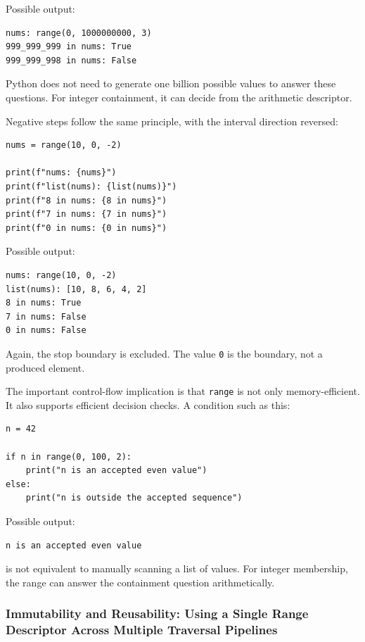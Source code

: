 Possible output:

\begin{verbatim}
nums: range(0, 1000000000, 3)
999_999_999 in nums: True
999_999_998 in nums: False
\end{verbatim}

Python does not need to generate one billion possible values to answer these questions. For integer containment, it can decide from the arithmetic descriptor.

Negative steps follow the same principle, with the interval direction reversed:

\begin{verbatim}
nums = range(10, 0, -2)

print(f"nums: {nums}")
print(f"list(nums): {list(nums)}")
print(f"8 in nums: {8 in nums}")
print(f"7 in nums: {7 in nums}")
print(f"0 in nums: {0 in nums}")
\end{verbatim}

Possible output:

\begin{verbatim}
nums: range(10, 0, -2)
list(nums): [10, 8, 6, 4, 2]
8 in nums: True
7 in nums: False
0 in nums: False
\end{verbatim}

Again, the stop boundary is excluded. The value \texttt{0} is the boundary, not a produced element.

The important control-flow implication is that \texttt{range} is not only memory-efficient. It also supports efficient decision checks. A condition such as this:

\begin{verbatim}
n = 42

if n in range(0, 100, 2):
    print("n is an accepted even value")
else:
    print("n is outside the accepted sequence")
\end{verbatim}

Possible output:

\begin{verbatim}
n is an accepted even value
\end{verbatim}

is not equivalent to manually scanning a list of values. For integer membership, the range can answer the containment question arithmetically.

\subsubsection{Immutability and Reusability: Using a Single Range Descriptor Across Multiple Traversal Pipelines}

